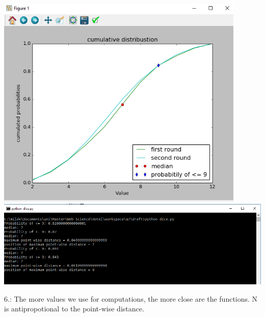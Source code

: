 \documentclass{WeSTassignment}
\begin{document}
\label{histogram for n = 1000}
\includegraphics[width=450px]{cdf2}
\label{CDF plot with 2 rounds for n = 1000}
\includegraphics[width=610px]{cons2}

6.: The more values we use for computations, the more close are the functions.
N is antipropotional to the point-wise distance.


\makefooter
\end{document}
